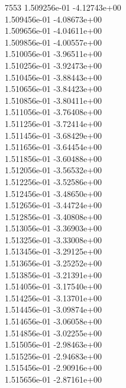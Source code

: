 7553	1.509256e-01	-4.12743e+00	\\ 	1.509456e-01	-4.08673e+00	\\ 	1.509656e-01	-4.04611e+00	\\ 	1.509856e-01	-4.00557e+00	\\ 	1.510056e-01	-3.96511e+00	\\ 	1.510256e-01	-3.92473e+00	\\ 	1.510456e-01	-3.88443e+00	\\ 	1.510656e-01	-3.84423e+00	\\ 	1.510856e-01	-3.80411e+00	\\ 	1.511056e-01	-3.76408e+00	\\ 	1.511256e-01	-3.72414e+00	\\ 	1.511456e-01	-3.68429e+00	\\ 	1.511656e-01	-3.64454e+00	\\ 	1.511856e-01	-3.60488e+00	\\ 	1.512056e-01	-3.56532e+00	\\ 	1.512256e-01	-3.52586e+00	\\ 	1.512456e-01	-3.48650e+00	\\ 	1.512656e-01	-3.44724e+00	\\ 	1.512856e-01	-3.40808e+00	\\ 	1.513056e-01	-3.36903e+00	\\ 	1.513256e-01	-3.33008e+00	\\ 	1.513456e-01	-3.29125e+00	\\ 	1.513656e-01	-3.25252e+00	\\ 	1.513856e-01	-3.21391e+00	\\ 	1.514056e-01	-3.17540e+00	\\ 	1.514256e-01	-3.13701e+00	\\ 	1.514456e-01	-3.09874e+00	\\ 	1.514656e-01	-3.06058e+00	\\ 	1.514856e-01	-3.02255e+00	\\ 	1.515056e-01	-2.98463e+00	\\ 	1.515256e-01	-2.94683e+00	\\ 	1.515456e-01	-2.90916e+00	\\ 	1.515656e-01	-2.87161e+00	\\ \hline
